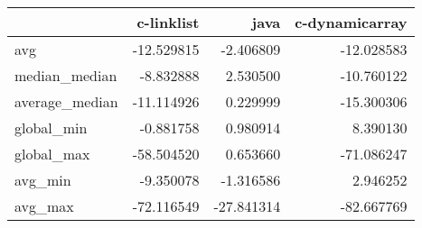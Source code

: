 \begin{tabular}{lrrr}
\toprule
{} &  c-linklist &       java &  c-dynamicarray \\
\midrule
avg            &  -12.529815 &  -2.406809 &      -12.028583 \\
median\_median  &   -8.832888 &   2.530500 &      -10.760122 \\
average\_median &  -11.114926 &   0.229999 &      -15.300306 \\
global\_min     &   -0.881758 &   0.980914 &        8.390130 \\
global\_max     &  -58.504520 &   0.653660 &      -71.086247 \\
avg\_min        &   -9.350078 &  -1.316586 &        2.946252 \\
avg\_max        &  -72.116549 & -27.841314 &      -82.667769 \\
\bottomrule
\end{tabular}
